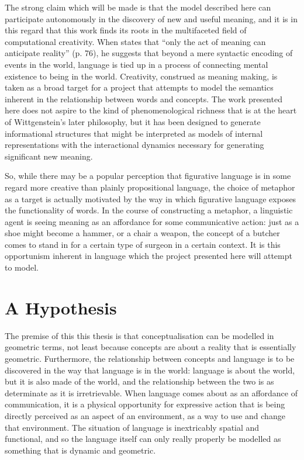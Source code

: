 The strong claim which will be made is that the model described here can participate autonomously in the discovery of new and useful meaning, and it is in this regard that this work finds its roots in the multifaceted field of computational creativity.  When \cite{Wittgenstein} states that ``only the act of meaning can anticipate reality'' (p. 76), he suggests that beyond a mere syntactic encoding of events in the world, language is tied up in a process of connecting mental existence to being in the world.  Creativity, construed as meaning making, is taken as a broad target for a project that attempts to model the semantics inherent in the relationship between words and concepts.  The work presented here does not aspire to the kind of phenomenological richness that is at the heart of Wittgenstein's later philosophy, but it has been designed to generate informational structures that might be interpreted as models of internal representations with the interactional dynamics necessary for generating significant new meaning.

So, while there may be a popular perception that figurative language is in some regard more creative than plainly propositional language, the choice of metaphor as a target is actually motivated by the way in which figurative language exposes the functionality of words.  In the course of constructing a metaphor, a linguistic agent is seeing meaning as an affordance for some communicative action: just as a shoe might become a hammer, or a chair a weapon, the concept of a butcher comes to stand in for a certain type of surgeon in a certain context.  It is this opportunism inherent in language which the project presented here will attempt to model.

\section{A Hypothesis}
The premise of this this thesis is that conceptualisation can be modelled in geometric terms, not least because concepts are about a reality that is essentially geometric.  Furthermore, the relationship between concepts and language is to be discovered in the way that language is in the world: language is about the world, but it is also made of the world, and the relationship between the two is as determinate as it is irretrievable.  When language comes about as an affordance of communication, it is a physical opportunity for expressive action that is being directly perceived as an aspect of an environment, as a way to use and change that environment.  The situation of language is inextricably spatial and functional, and so the language itself can only really properly be modelled as something that is dynamic and geometric.

